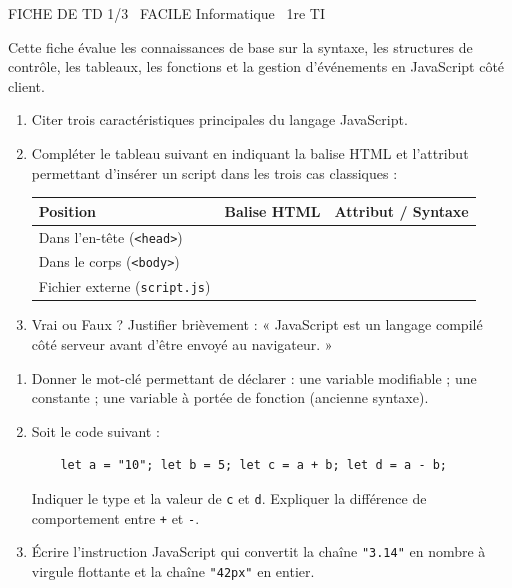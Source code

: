 \documentclass[11pt]{article}
\begin{document}
\begin{tcolorbox}[enhanced,colback=popink,colframe=popink,arc=10pt,boxrule=0pt,left=12pt,right=12pt,top=9pt,bottom=9pt]
{\color{white}\popxbold\small FICHE DE TD 1/3 \textbullet\ FACILE \hfill Informatique \textbullet\ 1re TI\par}
\end{tcolorbox}
\vspace{4pt}
Cette fiche évalue les connaissances de base sur la syntaxe, les structures de contrôle, les tableaux, les fonctions et la gestion d'événements en JavaScript côté client.

\begin{exercice}
\begin{enumerate}
    \item Citer trois caractéristiques principales du langage JavaScript.
    \item Compléter le tableau suivant en indiquant la balise HTML et l'attribut permettant d'insérer un script dans les trois cas classiques :
    \begin{tabular}{|l|l|l|}
    \hline
    \textbf{Position} & \textbf{Balise HTML} & \textbf{Attribut / Syntaxe} \\
    \hline
    Dans l'en-tête (\texttt{<head>}) & & \\
    \hline
    Dans le corps (\texttt{<body>}) & & \\
    \hline
    Fichier externe (\texttt{script.js}) & & \\
    \hline
    \end{tabular}
    \item Vrai ou Faux ? Justifier brièvement : « JavaScript est un langage compilé côté serveur avant d'être envoyé au navigateur. »
\end{enumerate}
\end{exercice}

\begin{exercice}
\begin{enumerate}
    \item Donner le mot-clé permettant de déclarer : une variable modifiable ; une constante ; une variable à portée de fonction (ancienne syntaxe).
    \item Soit le code suivant :
    \begin{verbatim}
    let a = "10"; let b = 5; let c = a + b; let d = a - b;
    \end{verbatim}
    Indiquer le type et la valeur de \texttt{c} et \texttt{d}. Expliquer la différence de comportement entre \texttt{+} et \texttt{-}.
    \item Écrire l'instruction JavaScript qui convertit la chaîne \texttt{"3.14"} en nombre à virgule flottante et la chaîne \texttt{"42px"} en entier.
\end{enumerate}
\end{exercice}
\end{document}
